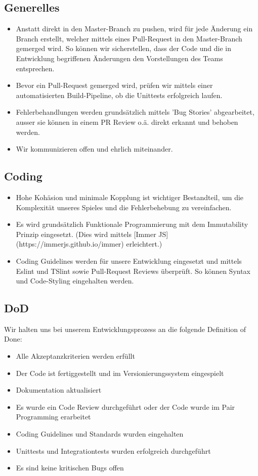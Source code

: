 \documentclass[11pt,a4paper]{scrartcl}
\begin{document}
\subsection{Generelles}
\begin{itemize}
  \item Anstatt direkt in den Master-Branch zu pushen, wird für jede Änderung ein Branch erstellt, welcher mittels eines Pull-Request in den Master-Branch gemerged wird.
        So können wir sicherstellen, dass der Code und die in Entwicklung begriffenen Änderungen den Vorstellungen des Teams entsprechen.
  \item Bevor ein Pull-Request gemerged wird, prüfen wir mittels einer automatisierten Build-Pipeline, ob die Unittests erfolgreich laufen.
  \item Fehlerbehandlungen werden grundsätzlich mittels 'Bug Stories' abgearbeitet, ausser sie können in einem PR Review o.ä. direkt erkannt und behoben werden.
  \item Wir kommunizieren offen und ehrlich miteinander.
\end{itemize}

\subsection{Coding}
\begin{itemize}
  \item Hohe Kohäsion und minimale Kopplung ist wichtiger Bestandteil, um die Komplexität unseres Spieles und die Fehlerbehebung zu vereinfachen.
  \item Es wird grundsätzlich Funktionale Programmierung mit dem Immutability Prinzip eingesetzt. (Dies wird mittels [Immer JS](https://immerjs.github.io/immer) erleichtert.)
  \item Coding Guidelines werden für unsere Entwicklung eingesetzt und mittels Eslint und TSlint sowie Pull-Request Reviews überprüft. So können Syntax und Code-Styling eingehalten werden.
\end{itemize}

\subsection{DoD}
Wir halten uns bei unserem Entwicklungsprozess an die folgende Definition of Done:
\begin{itemize}
  \item Alle Akzeptanzkriterien werden erfüllt
  \item Der Code ist fertiggestellt und im Versionierungssystem eingespielt
  \item Dokumentation aktualisiert
  \item Es wurde ein Code Review durchgeführt oder der Code wurde im Pair Programming erarbeitet
  \item Coding Guidelines und Standards wurden eingehalten
  \item Unittests und Integrationtests wurden erfolgreich durchgeführt
  \item Es sind keine kritischen Bugs offen
\end{itemize}
\end{document}
